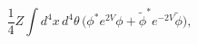 \begin{equation}
\frac{1}{4} Z \int d^4x\,d^4\theta\,\Big(\phi^* e^{2V}\phi
+ \tilde\phi^* e^{-2V} \tilde\phi\Big),
\end{equation}

